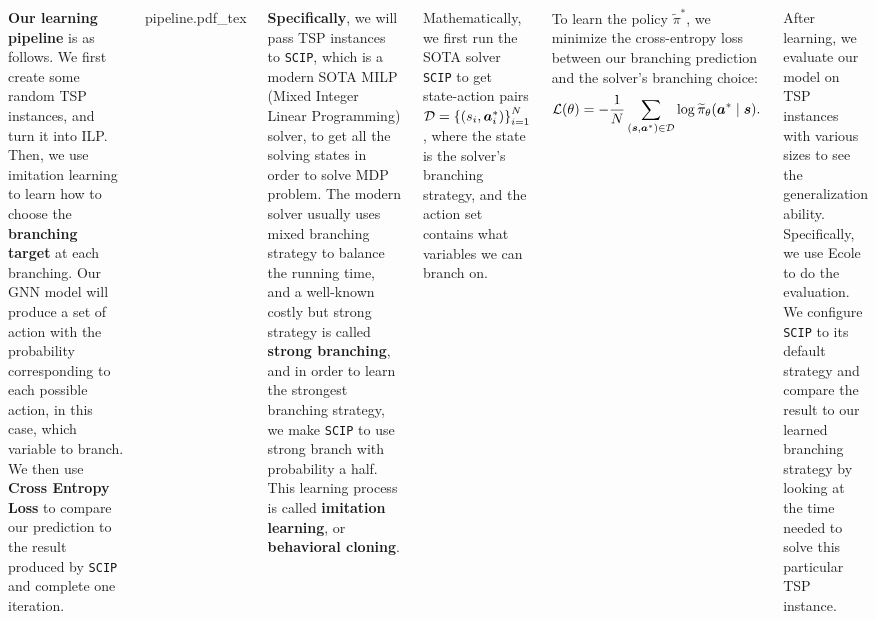 \documentclass[20pt,,margin=1in,innermargin=-4.5in,blockverticalspace=-0.25in]{tikzposter}
\newcommand{\incfig}[1]{%
	\def\svgwidth{0.35\columnwidth}
	{#1.pdf_tex}
}
\begin{document}
\begin{columns}
{	\vspace{1em}
	\textbf{Our learning pipeline} is as follows. We first create some random TSP instances, and turn it into ILP.
	Then, we use imitation learning to learn how to choose the \textbf{branching target} at each branching.
	Our GNN model will produce a set of action with the probability corresponding to each possible action, in this
	case, which variable to branch. We then use \textbf{Cross Entropy Loss} to compare our prediction to the result
	produced by \texttt{SCIP} and complete one iteration.
	\begin{tikzfigure}
		\centering
		\incfig{pipeline}
	\end{tikzfigure}
	\textbf{Specifically}, we will pass TSP instances to \texttt{SCIP}, which is a modern SOTA MILP (Mixed Integer Linear Programming) solver, to get all
	the solving states in order to solve MDP problem. The modern solver usually uses mixed branching strategy to balance the running
	time, and a well-known costly but strong strategy is called \textbf{strong branching}, and in order to learn the strongest branching strategy, we make
	\texttt{SCIP} to use strong branch with probability a half. This learning process is called \textbf{imitation learning}, or \textbf{behavioral
		cloning}.

	Mathematically, we first run the SOTA solver \texttt{SCIP} to get state-action pairs \(\mathcal{\MakeUppercase{d}} = \left\{(s_{i} , \bm{a} _{i} ^\ast)\right\}_{i = 1}^N\),
	where the state is the solver's branching strategy, and the action set contains what variables we can branch on.


	To learn the policy \(\widetilde{\pi} ^\ast\), we minimize the cross-entropy loss between our branching prediction and the solver's branching choice:
	\[
		\mathcal{\MakeUppercase{l}} (\theta ) = - \frac{1}{N}\sum\limits_{(\bm{s}, \bm{a}^\ast)\in \mathcal{\MakeUppercase{d}} }\log \widetilde{\pi}_\theta (\bm{a} ^\ast \mid \bm{s} ).
	\]

	After learning, we evaluate our model on TSP instances with various sizes to see the generalization ability. Specifically, we use
	Ecole to do the evaluation. We configure \texttt{SCIP} to its default strategy and compare the result to our learned branching
	strategy by looking at the time needed to solve this particular TSP instance.
	}


\end{columns}
\end{document}
